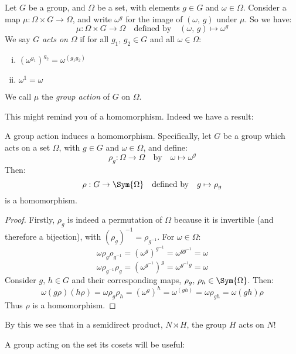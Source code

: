 \begin{definition}
    \raggedright
    Let \(G\) be a group, and \(\Omega\) be a set, with elements \(g \in G\) and \(\omega \in \Omega\).
    Consider a map \(\mu:\Omega \times G \to \Omega\), and write \(\omega^g\) for the image of \((\omega,\,g)\) under
    \(\mu\).
    So we have:
    \[\mu:\Omega \times G \to \Omega \quad \text{defined by} \quad (\omega,\,g) \mapsto \omega^g\]
    We say \(G\) \emph{acts on} \(\Omega\) if for all \(g_1,\,g_2 \in G\) and all \(\omega \in \Omega\):
    \begin{enumerate}[(i)]
        \item \({(\omega^{g_1})}^{g_2} = \omega^{(g_1 g_2)}\)
        \item \(\omega^1 = \omega\)
    \end{enumerate}
    We call \(\mu\) the \emph{group action} of \(G\) on \(\Omega\).
\end{definition}

This might remind you of a homomorphism.
Indeed we have a result:

\begin{lemma}\label{lem:actionhom}
    \raggedright
    A group action induces a homomorphism.
    Specifically, let \(G\) be a group which acts on a set \(\Omega\), with \(g \in G\) and \(\omega \in \Omega\), and
    define:
    \[\rho_g:\Omega \to \Omega \quad \text{by} \quad \omega \mapsto \omega^g\]
    Then:
    \[\rho:G \to \Sym{\Omega} \quad \text{defined by} \quad g \mapsto \rho_g\]
    is a homomorphism.
\end{lemma}

\begin{proof}
    Firstly, \(\rho_g\) is indeed a permutation of \(\Omega\) because it is invertible (and therefore a bijection),
    with \({(\rho_g)}^{-1} = \rho_{g^{-1}}\).
    For \(\omega \in \Omega\):
    \[ \omega \rho_g \rho_{g^{-1}} = {(\omega^g)}^{g^{-1}} = \omega^{gg^{-1}} = \omega \]
    \[ \omega \rho_{g^{-1}} \rho_g = {(\omega^{g^{-1}})}^g = \omega^{g^{-1}g} = \omega \]
    Consider \(g,\,h \in G\) and their corresponding maps, \(\rho_{g},\,\rho_{h} \in \Sym{\Omega}\).
    Then:
    \[\omega(g\rho)(h\rho) = \omega\rho_g\rho_h = {(\omega^g)}^h = \omega^{(gh)} = \omega\rho_{gh} = \omega(gh)\rho\]
    Thus \(\rho\) is a homomorphism.
\end{proof}

By this we see that in a semidirect product, \(N \rtimes H\), the group \(H\) acts on \(N\)!

A group acting on the set its cosets will be useful:

